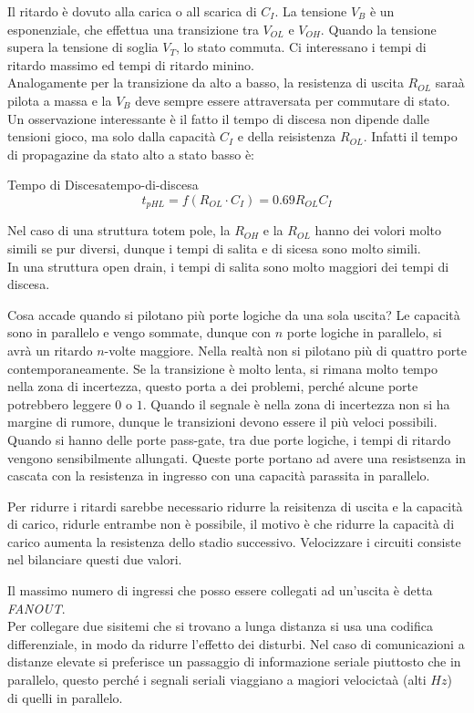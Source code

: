 \documentclass[12pt]{article}
\begin{document}
Il ritardo \`e dovuto alla carica o all scarica di $C_I$. La tensione $V_B$ \`e un esponenziale, che effettua una transizione tra $V_{OL}$ e $V_{OH}$. Quando la tensione supera la tensione di soglia $V_T$, lo stato commuta. Ci interessano i tempi di ritardo massimo ed tempi di ritardo minino. \\
Analogamente per la transizione da alto a basso, la resistenza di uscita $R_{OL}$ sara\`a pilota a massa e la $V_B$ deve sempre essere attraversata per commutare di stato. Un osservazione interessante \`e il fatto il tempo di discesa non dipende dalle tensioni gioco, ma solo dalla capacit\`a $C_I$ e della reisistenza $R_{OL}$. Infatti il tempo di propagazine da stato alto a stato basso \`e:
\begin{definition}{Tempo di Discesa}{tempo-di-discesa}
    \[ t_{pHL} = f(R_{OL} \cdot C_I) = 0.69 R_{OL} C_I \]
\end{definition}

Nel caso di una struttura totem pole, la $R_{OH}$ e la $R_{OL}$ hanno dei volori molto simili se pur diversi, dunque i tempi di salita e di sicesa sono molto simili. \\
In una struttura open drain, i tempi di salita sono molto maggiori dei tempi di discesa.

Cosa accade quando si pilotano pi\`u porte logiche da una sola uscita? Le capacit\`a sono in parallelo e vengo sommate, dunque con $n$ porte logiche in parallelo, si avr\`a un ritardo $n$-volte maggiore. Nella realt\`a non si pilotano pi\`u di quattro porte contemporaneamente. Se la transizione \`e molto lenta, si rimana molto tempo nella zona di incertezza, questo porta a dei problemi, perch\'e alcune porte potrebbero leggere $0$ o $1$. Quando il segnale \`e nella zona di incertezza non si ha margine di rumore, dunque le transizioni devono essere il pi\`u veloci possibili. \\
Quando si hanno delle porte pass-gate, tra due porte logiche, i tempi di ritardo vengono sensibilmente allungati. Queste porte portano ad avere una resistsenza in cascata con la resistenza in ingresso con una capacit\`a parassita in parallelo.

Per ridurre i ritardi sarebbe necessario ridurre la reisitenza di uscita e la capacit\`a di carico, ridurle entrambe non \`e possibile, il motivo \`e che ridurre la capacit\`a di carico aumenta la resistenza dello stadio successivo. Velocizzare i circuiti consiste nel bilanciare questi due valori.

Il massimo numero di ingressi che posso essere collegati ad un'uscita \`e detta \emph{FANOUT}. \\
Per collegare due sisitemi che si trovano a lunga distanza si usa una codifica differenziale, in modo da ridurre l'effetto dei disturbi. Nel caso di comunicazioni a distanze elevate si preferisce un passaggio di informazione seriale piuttosto che in parallelo, questo perch\'e i segnali seriali viaggiano a magiori velocicta\`a (alti $Hz$) di quelli in parallelo.
\end{document}
